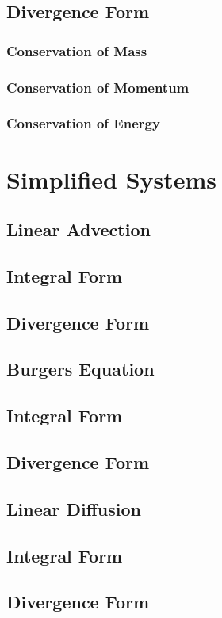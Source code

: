 \section{Divergence Form}

\subsection{Conservation of Mass}

\subsection{Conservation of Momentum}

\subsection{Conservation of Energy}

\chapter{Simplified Systems}

\section{Linear Advection}

\section{Integral Form}

\section{Divergence Form}

\section{Burgers Equation}

\section{Integral Form}

\section{Divergence Form}

\section{Linear Diffusion}

\section{Integral Form}

\section{Divergence Form}